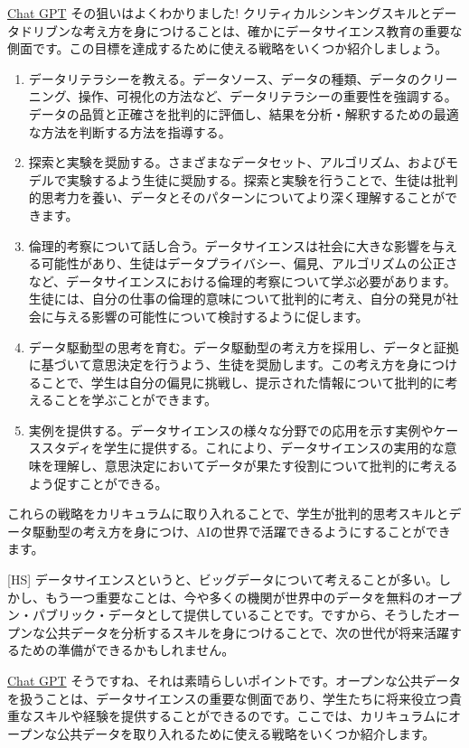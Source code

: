 \documentclass[
]{book}
\theoremstyle{definition}
\theoremstyle{definition}
\theoremstyle{definition}
\theoremstyle{definition}
\theoremstyle{remark}
\begin{document}
\protect\hyperlink{chatgpt}{Chat GPT} その狙いはよくわかりました! クリティカルシンキングスキルとデータドリブンな考え方を身につけることは、確かにデータサイエンス教育の重要な側面です。この目標を達成するために使える戦略をいくつか紹介しましょう。

\begin{enumerate}
\def\labelenumi{\arabic{enumi}.}
\item
  データリテラシーを教える。データソース、データの種類、データのクリーニング、操作、可視化の方法など、データリテラシーの重要性を強調する。データの品質と正確さを批判的に評価し、結果を分析・解釈するための最適な方法を判断する方法を指導する。
\item
  探索と実験を奨励する。さまざまなデータセット、アルゴリズム、およびモデルで実験するよう生徒に奨励する。探索と実験を行うことで、生徒は批判的思考力を養い、データとそのパターンについてより深く理解することができます。
\item
  倫理的考察について話し合う。データサイエンスは社会に大きな影響を与える可能性があり、生徒はデータプライバシー、偏見、アルゴリズムの公正さなど、データサイエンスにおける倫理的考察について学ぶ必要があります。生徒には、自分の仕事の倫理的意味について批判的に考え、自分の発見が社会に与える影響の可能性について検討するように促します。
\item
  データ駆動型の思考を育む。データ駆動型の考え方を採用し、データと証拠に基づいて意思決定を行うよう、生徒を奨励します。この考え方を身につけることで、学生は自分の偏見に挑戦し、提示された情報について批判的に考えることを学ぶことができます。
\item
  実例を提供する。データサイエンスの様々な分野での応用を示す実例やケーススタディを学生に提供する。これにより、データサイエンスの実用的な意味を理解し、意思決定においてデータが果たす役割について批判的に考えるよう促すことができる。
\end{enumerate}

これらの戦略をカリキュラムに取り入れることで、学生が批判的思考スキルとデータ駆動型の考え方を身につけ、AIの世界で活躍できるようにすることができます。

{[}HS{]} データサイエンスというと、ビッグデータについて考えることが多い。しかし、もう一つ重要なことは、今や多くの機関が世界中のデータを無料のオープン・パブリック・データとして提供していることです。ですから、そうしたオープンな公共データを分析するスキルを身につけることで、次の世代が将来活躍するための準備ができるかもしれません。

\protect\hyperlink{chatgpt}{Chat GPT} そうですね、それは素晴らしいポイントです。オープンな公共データを扱うことは、データサイエンスの重要な側面であり、学生たちに将来役立つ貴重なスキルや経験を提供することができるのです。ここでは、カリキュラムにオープンな公共データを取り入れるために使える戦略をいくつか紹介します。
\end{document}

